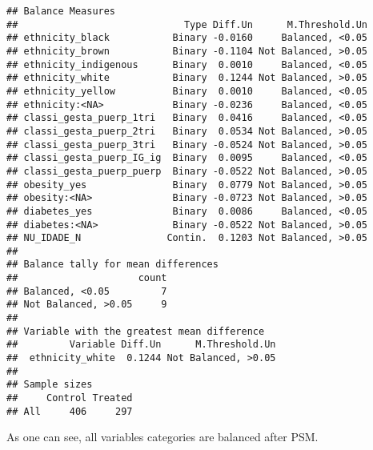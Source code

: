 \documentclass[
]{article}
\newenvironment{Shaded}{\begin{snugshade}}{\end{snugshade}}
\newcommand{\AttributeTok}[1]{\textcolor[rgb]{0.13,0.29,0.53}{#1}}
\newcommand{\ConstantTok}[1]{\textcolor[rgb]{0.56,0.35,0.01}{#1}}
\newcommand{\DocumentationTok}[1]{\textcolor[rgb]{0.56,0.35,0.01}{\textbf{\textit{#1}}}}
\newcommand{\FloatTok}[1]{\textcolor[rgb]{0.00,0.00,0.81}{#1}}
\newcommand{\FunctionTok}[1]{\textcolor[rgb]{0.13,0.29,0.53}{\textbf{#1}}}
\newcommand{\NormalTok}[1]{#1}
\newcommand{\OtherTok}[1]{\textcolor[rgb]{0.56,0.35,0.01}{#1}}
\newcommand{\SpecialCharTok}[1]{\textcolor[rgb]{0.81,0.36,0.00}{\textbf{#1}}}
\newcommand{\StringTok}[1]{\textcolor[rgb]{0.31,0.60,0.02}{#1}}
\begin{document}
\begin{verbatim}
## Balance Measures
##                             Type Diff.Un      M.Threshold.Un
## ethnicity_black           Binary -0.0160     Balanced, <0.05
## ethnicity_brown           Binary -0.1104 Not Balanced, >0.05
## ethnicity_indigenous      Binary  0.0010     Balanced, <0.05
## ethnicity_white           Binary  0.1244 Not Balanced, >0.05
## ethnicity_yellow          Binary  0.0010     Balanced, <0.05
## ethnicity:<NA>            Binary -0.0236     Balanced, <0.05
## classi_gesta_puerp_1tri   Binary  0.0416     Balanced, <0.05
## classi_gesta_puerp_2tri   Binary  0.0534 Not Balanced, >0.05
## classi_gesta_puerp_3tri   Binary -0.0524 Not Balanced, >0.05
## classi_gesta_puerp_IG_ig  Binary  0.0095     Balanced, <0.05
## classi_gesta_puerp_puerp  Binary -0.0522 Not Balanced, >0.05
## obesity_yes               Binary  0.0779 Not Balanced, >0.05
## obesity:<NA>              Binary -0.0723 Not Balanced, >0.05
## diabetes_yes              Binary  0.0086     Balanced, <0.05
## diabetes:<NA>             Binary -0.0522 Not Balanced, >0.05
## NU_IDADE_N               Contin.  0.1203 Not Balanced, >0.05
## 
## Balance tally for mean differences
##                     count
## Balanced, <0.05         7
## Not Balanced, >0.05     9
## 
## Variable with the greatest mean difference
##         Variable Diff.Un      M.Threshold.Un
##  ethnicity_white  0.1244 Not Balanced, >0.05
## 
## Sample sizes
##     Control Treated
## All     406     297
\end{verbatim}

As one can see, all variables categories are balanced after PSM.

\begin{Shaded}
\end{Shaded}
\end{document}
